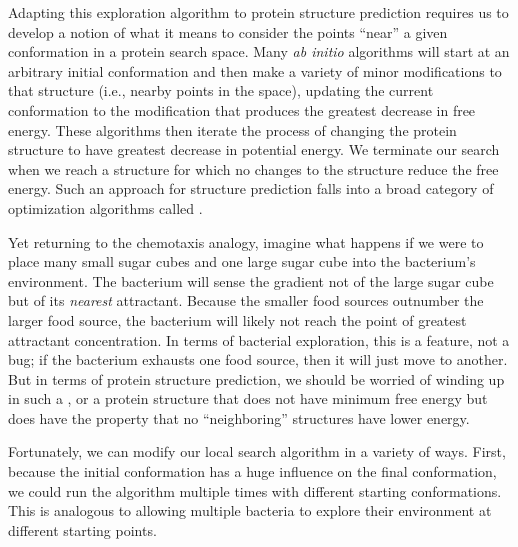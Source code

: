 Adapting this exploration algorithm to protein structure prediction requires us to develop a notion of what it means to consider the points ``near'' a given conformation in a protein search space. Many \textit{ab initio} algorithms will start at an arbitrary initial conformation and then make a variety of minor modifications to that structure (i.e., nearby points in the space), updating the current conformation to the modification that produces the greatest decrease in free energy. These algorithms then iterate the process of changing the protein structure to have greatest decrease in potential energy. We terminate our search when we reach a structure for which no changes to the structure reduce the free energy. Such an approach for structure prediction falls into a broad category of optimization algorithms called .

Yet returning to the chemotaxis analogy, imagine what happens if we were to place many small sugar cubes and one large sugar cube into the bacterium's environment. The bacterium will sense the gradient not of the large sugar cube but of its \textit{nearest} attractant. Because the smaller food sources outnumber the larger food source, the bacterium will likely not reach the point of greatest attractant concentration. In terms of bacterial exploration, this is a feature, not a bug; if the bacterium exhausts one food source, then it will just move to another. But in terms of protein structure prediction, we should be worried of winding up in such a , or a protein structure that does not have minimum free energy but does have  the property that no ``neighboring'' structures have lower energy.\\

\begin{qbox}\end{qbox}

Fortunately, we can modify our local search algorithm in a variety of ways. First, because the initial conformation has a huge influence on the final conformation, we could run the algorithm multiple times with different starting conformations. This is analogous to allowing multiple bacteria to explore their environment at different starting points.

